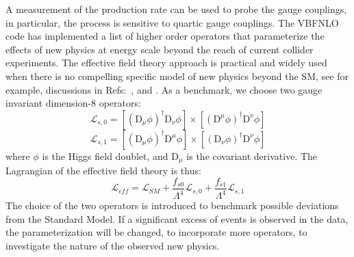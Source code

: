 A measurement
of the production rate can be used to probe the gauge couplings, in
particular, the process is sensitive to quartic gauge couplings. The
{\sc VBFNLO } code has implemented a list of higher order operators
that parameterize the effects of new physics at energy scale beyond
the reach of current collider experiments.  The effective field theory
approach is practical and widely used when there is no compelling
specific model of new physics beyond the SM, see for example,
discussions in Refs:~\cite{Hagiwara:1993ck}, \cite{Buchmuller:1985jz}
and \cite{Eboli:2006wa}.  As a benchmark, we choose two gauge
invariant dimension-8 operators:
\begin{equation}
\mathcal{L}_{s,0} = [(\mathrm{D}_\mu\phi)^\dag\mathrm{D}_\nu \phi]\times [(\mathrm{D}^\mu\phi)^\dag\mathrm{D}^\nu \phi]
\end{equation}
\begin{equation}
\mathcal{L}_{s,1} = [(\mathrm{D}_\mu\phi)^\dag\mathrm{D}^\mu \phi]\times [(\mathrm{D}_\nu\phi)^\dag\mathrm{D}^\nu \phi]
\end{equation}
where $\phi$ is the Higgs field doublet, and $\mathrm{D}_\mu$ is the covariant derivative. 
The Lagrangian of the effective field theory is thus: 
\begin{equation}
\mathcal{L}_{eff} = \mathcal{L}_{SM} + \frac{f_{s0}}{\Lambda^4}\mathcal{L}_{s,0}+\frac{f_{s1}}{\Lambda^4}\mathcal{L}_{s,1}
\end{equation}
The choice of the two operators is introduced to benchmark possible
deviations from the Standard Model. If a significant excess of events is 
observed in the data, the parameterization will be changed, to incorporate 
more operators, to
investigate the nature of the observed new physics.





